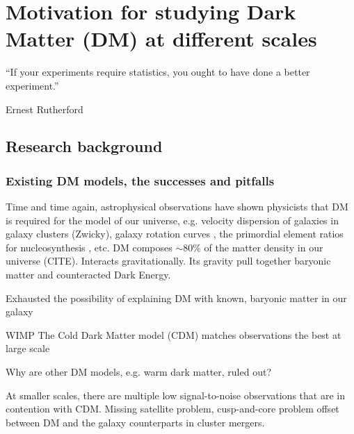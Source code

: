 \documentclass[ucdthesis.tex]{subfiles}
\begin{document}
    \doublespacing

		\chapter{Motivation for studying Dark Matter (DM) at different 
			scales}		
		\label{chapter:1}
    \epigraph{``If your experiments require statistics, you ought to have done a
		better experiment.''}{Ernest Rutherford} 

		\section{Research background}

		\subsection{Existing DM models, the successes and pitfalls}
		Time and time again, astrophysical
		observations have shown physicists that DM is required for
		the model of our universe, e.g.	velocity dispersion of galaxies in galaxy clusters
		(Zwicky), galaxy rotation
		curves \citep{Rubin1970}, the primordial element ratios for nucleosynthesis
		\citep{Dar1995}, 
		\citep{Clowe06} etc. DM composes $\sim$80\% of the matter density in our universe
		(CITE). 
		Interacts gravitationally.	
		Its gravity pull together baryonic matter and counteracted 
		Dark Energy.  

		Exhausted the possibility of explaining DM with known, baryonic matter in
		our galaxy  


		WIMP 
		The Cold Dark Matter model (CDM) matches observations the best at large scale

		Why are other DM models, e.g. warm dark matter, ruled out?

		At smaller scales, there are multiple low signal-to-noise observations that 
		are in contention with CDM. Missing satellite problem, cusp-and-core problem 
		offset between DM and the galaxy counterparts in cluster mergers.
\end{document}
